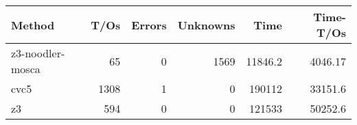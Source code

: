 \begin{tabular}{lrrrrr}
\hline
 Method           &   T/Os &   Errors &   Unknowns &     Time &   Time-T/Os \\
\hline
 z3-noodler-mosca &     65 &        0 &       1569 &  11846.2 &     4046.17 \\
 cvc5             &   1308 &        1 &          0 & 190112   &    33151.6  \\
 z3               &    594 &        0 &          0 & 121533   &    50252.6  \\
\hline
\end{tabular}
